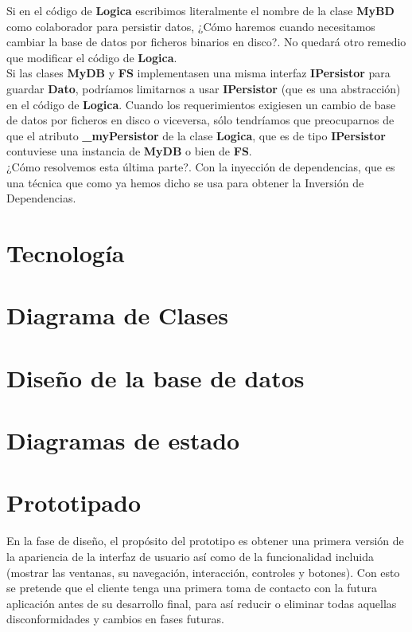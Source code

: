 \documentclass[../pfc.tex]{subfiles}
\begin{document}
	Si en el código de \textbf{Logica} escribimos literalmente el nombre de la clase \textbf{MyBD} como colaborador para persistir datos, ¿Cómo haremos cuando necesitamos cambiar la base de datos por ficheros binarios en disco?. No quedará otro remedio que modificar el código de \textbf{Logica}.\\
	
	Si las clases \textbf{MyDB} y \textbf{FS} implementasen una misma interfaz \textbf{IPersistor} para guardar \textbf{Dato}, podríamos limitarnos a usar \textbf{IPersistor} (que es una abstracción) en el código de \textbf{Logica}. Cuando los requerimientos exigiesen un cambio de base de datos por ficheros en disco o viceversa, sólo tendríamos que preocuparnos de que el atributo \textbf{\_myPersistor} de la clase \textbf{Logica}, que es de tipo \textbf{IPersistor} contuviese una instancia de \textbf{MyDB} o bien de \textbf{FS}.\\
	
	¿Cómo resolvemos esta última parte?. Con la inyección de dependencias, que es una técnica que como ya hemos dicho se usa para obtener la Inversión de Dependencias.\\
	
	
	\section{Tecnología}
	
	\section{Diagrama de Clases}
	
	\section{Diseño de la base de datos}
	
	\section{Diagramas de estado}
	
	\section{Prototipado}
	
	En la fase de diseño, el propósito del prototipo es obtener una primera versión de la apariencia de la interfaz de usuario así como de la funcionalidad incluida (mostrar las ventanas, su navegación, interacción, controles y botones). Con esto se pretende que el cliente tenga una primera toma de contacto con la futura aplicación antes de su desarrollo final, para así reducir o eliminar todas aquellas disconformidades y cambios en fases futuras.
	
\end{document}
